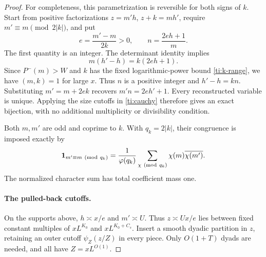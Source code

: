 \begin{proof}
For completeness, this parametrization is reversible for both signs
of $k$. Start from positive factorizations
$z=m'h$, $z+k=mh'$, require
$m'\equiv m\pmod{2|k|}$, and put
\begin{equation}\label{ti:determinant-reverse}
               e=\frac{m'-m}{2k}>0,\qquad
               n=\frac{2eh+1}{m}.
\end{equation}
The first quantity is an integer. The determinant identity implies
\[
                       m(h'-h)=k(2eh+1).
\]
Since $P^-(m)>W$ and $k$ has the fixed logarithmic-power bound
\eqref{ti:k-range}, we have $(m,k)=1$ for large $x$. Thus $n$ is
a positive integer and $h'-h=kn$. Substituting $m'=m+2ek$ recovers
$m'n=2eh'+1$. Every reconstructed variable is unique. Applying the
size cutoffs in \eqref{ti:cauchy} therefore gives an exact bijection,
with no additional multiplicity or divisibility condition.

Both $m,m'$ are odd and coprime to $k$. With $q_k=2|k|$, their
congruence is imposed exactly by
\begin{equation}\label{ti:character-orthogonality}
 \mathbf{1}_{m'\equiv m\ ({\rm mod}\ q_k)}
        =\frac1{\varphi(q_k)}\sum_{\chi\ ({\rm mod}\ q_k)}
                              \chi(m)\overline{\chi(m')}.
\end{equation}
The normalized character sum has total coefficient mass one.

\paragraph{The pulled-back cutoffs.}
On the supports above, $h\asymp x/e$ and $m'\asymp U$. Thus
$z\asymp Ux/e$ lies between fixed constant multiples of
$xL^{K_0}$ and $xL^{K_0+C_s}$. Insert a smooth dyadic partition
in $z$, retaining an outer cutoff $\psi_Z(z/Z)$ in every piece.
Only $O(1+T)$ dyads are needed, and all have $Z=xL^{O(1)}$.


\end{proof}
